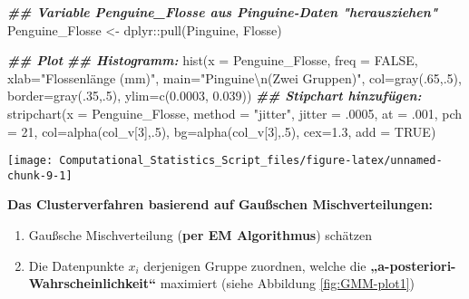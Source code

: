 \documentclass[
  ngerman,
]{book}
\newenvironment{Shaded}{\begin{snugshade}}{\end{snugshade}}
\newcommand{\AttributeTok}[1]{\textcolor[rgb]{0.77,0.63,0.00}{#1}}
\newcommand{\ConstantTok}[1]{\textcolor[rgb]{0.00,0.00,0.00}{#1}}
\newcommand{\DecValTok}[1]{\textcolor[rgb]{0.00,0.00,0.81}{#1}}
\newcommand{\DocumentationTok}[1]{\textcolor[rgb]{0.56,0.35,0.01}{\textbf{\textit{#1}}}}
\newcommand{\FloatTok}[1]{\textcolor[rgb]{0.00,0.00,0.81}{#1}}
\newcommand{\FunctionTok}[1]{\textcolor[rgb]{0.00,0.00,0.00}{#1}}
\newcommand{\NormalTok}[1]{#1}
\newcommand{\OtherTok}[1]{\textcolor[rgb]{0.56,0.35,0.01}{#1}}
\newcommand{\SpecialCharTok}[1]{\textcolor[rgb]{0.00,0.00,0.00}{#1}}
\newcommand{\StringTok}[1]{\textcolor[rgb]{0.31,0.60,0.02}{#1}}
\providecommand{\tightlist}{%
  \setlength{\itemsep}{0pt}\setlength{\parskip}{0pt}}
\begin{document}
\begin{Shaded}
\begin{Highlighting}[]
\DocumentationTok{\#\# Variable \textquotesingle{}Penguine\_Flosse\textquotesingle{} aus Pinguine{-}Daten "herausziehen"}
\NormalTok{Penguine\_Flosse }\OtherTok{\textless{}{-}}\NormalTok{ dplyr}\SpecialCharTok{::}\FunctionTok{pull}\NormalTok{(Pinguine, Flosse)}

\DocumentationTok{\#\# Plot}
\DocumentationTok{\#\# Histogramm:}
\FunctionTok{hist}\NormalTok{(}\AttributeTok{x =}\NormalTok{ Penguine\_Flosse, }\AttributeTok{freq =} \ConstantTok{FALSE}\NormalTok{, }
     \AttributeTok{xlab=}\StringTok{"Flossenlänge (mm)"}\NormalTok{, }\AttributeTok{main=}\StringTok{"Pinguine}\SpecialCharTok{\textbackslash{}n}\StringTok{(Zwei Gruppen)"}\NormalTok{,}
     \AttributeTok{col=}\FunctionTok{gray}\NormalTok{(.}\DecValTok{65}\NormalTok{,.}\DecValTok{5}\NormalTok{), }\AttributeTok{border=}\FunctionTok{gray}\NormalTok{(.}\DecValTok{35}\NormalTok{,.}\DecValTok{5}\NormalTok{), }\AttributeTok{ylim=}\FunctionTok{c}\NormalTok{(}\FloatTok{0.0003}\NormalTok{, }\FloatTok{0.039}\NormalTok{))}
\DocumentationTok{\#\# Stipchart hinzufügen:}
\FunctionTok{stripchart}\NormalTok{(}\AttributeTok{x =}\NormalTok{ Penguine\_Flosse, }\AttributeTok{method =} \StringTok{"jitter"}\NormalTok{, }
           \AttributeTok{jitter =}\NormalTok{ .}\DecValTok{0005}\NormalTok{, }\AttributeTok{at =}\NormalTok{ .}\DecValTok{001}\NormalTok{,}
           \AttributeTok{pch =} \DecValTok{21}\NormalTok{, }\AttributeTok{col=}\FunctionTok{alpha}\NormalTok{(col\_v[}\DecValTok{3}\NormalTok{],.}\DecValTok{5}\NormalTok{), }
           \AttributeTok{bg=}\FunctionTok{alpha}\NormalTok{(col\_v[}\DecValTok{3}\NormalTok{],.}\DecValTok{5}\NormalTok{), }\AttributeTok{cex=}\FloatTok{1.3}\NormalTok{, }\AttributeTok{add =} \ConstantTok{TRUE}\NormalTok{)}
\end{Highlighting}
\end{Shaded}

\begin{center}\texttt{[image: Computational\_Statistics\_Script\_files/figure-latex/unnamed-chunk-9-1]} \end{center}

\textbf{Das Clusterverfahren basierend auf Gaußschen Mischverteilungen:}

\begin{enumerate}
\def\labelenumi{\arabic{enumi}.}
\tightlist
\item
  Gaußsche Mischverteilung (\textbf{per EM Algorithmus}) schätzen
\item
  Die Datenpunkte \(x_i\) derjenigen Gruppe zuordnen, welche die \textbf{„a-posteriori-Wahrscheinlichkeit``} maximiert (siehe Abbildung \ref{fig:GMM-plot1})
\end{enumerate}
\end{document}
